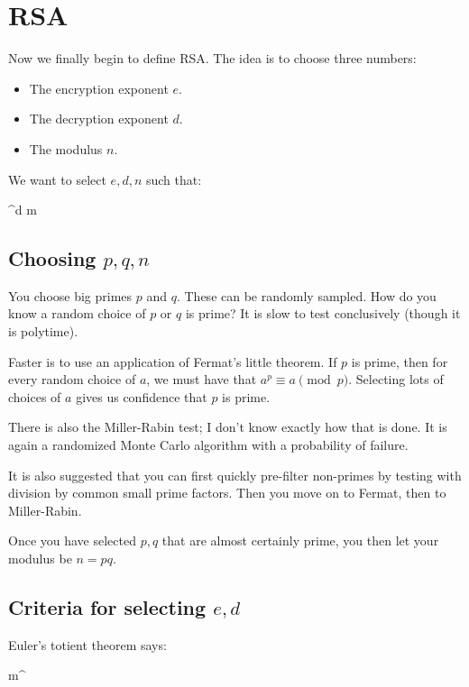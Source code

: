 \section{RSA}

Now we finally begin to define RSA. The idea is to choose three numbers:

\begin{itemize}
  \item
    The encryption exponent $e$.
  \item
    The decryption exponent $d$.
  \item
    The modulus $n$.
\end{itemize}

We want to select $e, d, n$ such that:

\begin{nedqn}
  ^d
\equivcol
  m 
\end{nedqn}

\subsection{Choosing $p, q, n$}

You choose big primes $p$ and $q$. These can be randomly sampled. How do
you know a random choice of $p$ or $q$ is prime? It is slow to test
conclusively (though it is polytime).

Faster is to use an application of Fermat's little theorem. If $p$ is
prime, then for every random choice of $a$, we must have that $a^p
\equiv a \pmod{p}$. Selecting lots of choices of $a$ gives us confidence
that $p$ is prime.

There is also the Miller-Rabin test; I don't know exactly how that is
done. It is again a randomized Monte Carlo algorithm with a probability
of failure.

It is also suggested that you can first quickly pre-filter non-primes by
testing with division by common small prime factors. Then you move on to
Fermat, then to Miller-Rabin.

Once you have selected $p, q$ that are almost certainly prime, you
then let your modulus be $n = pq$.

\subsection{Criteria for selecting $e, d$}

Euler's totient theorem says:

\begin{nedqn}
  m^{}
 
\end{nedqn}

